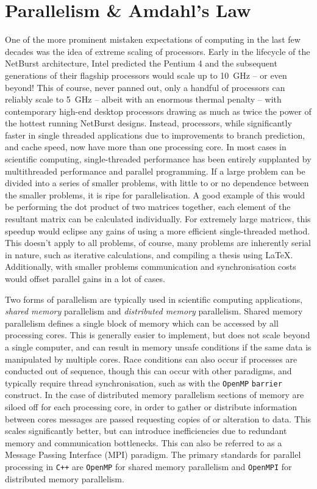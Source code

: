 \section{Parallelism \& Amdahl's Law}
\label{app:parallelism}

One of the more prominent mistaken expectations of computing in the last few decades was the idea of extreme scaling of processors.
Early in the lifecycle of the NetBurst architecture, Intel predicted the Pentium 4 and the subsequent generations of their flagship processors would scale up to \SI{10}{\giga\hertz} -- or even beyond!
This of course, never panned out, only a handful of processors can reliably scale to \SI{5}{\giga\hertz} -- albeit with an enormous thermal penalty -- with contemporary high-end desktop processors drawing as much as twice the power of the hottest running NetBurst designs.
Instead, processors, while significantly faster in single threaded applications due to improvements to branch prediction, and cache speed, now have more than one processing core.
In most cases in scientific computing, single-threaded performance has been entirely supplanted by multithreaded performance and parallel programming.
If a large problem can be divided into a series of smaller problems, with little to or no dependence between the smaller problems, it is ripe for parallelisation.
A good example of this would be performing the dot product of two matrices together, each element of the resultant matrix can be calculated individually.
For extremely large matrices, this speedup would eclipse any gains of using a more efficient single-threaded method.
This doesn't apply to all problems, of course, many problems are inherently serial in nature, such as iterative calculations, and compiling a thesis using \LaTeX.
Additionally, with smaller problems communication and synchronisation costs would offset parallel gains in a lot of cases.

Two forms of parallelism are typically used in scientific computing applications, \emph{shared memory} parallelism and \emph{distributed memory} parallelism.
Shared memory parallelism defines a single block of memory which can be accessed by all processing cores.
This is generally easier to implement, but does not scale beyond a single computer, and can result in memory unsafe conditions if the same data is manipulated by multiple cores.
Race conditions can also occur if processes are conducted out of sequence, though this can occur with other paradigms, and typically require thread synchronisation, such as with the \texttt{OpenMP} \texttt{barrier} construct.
In the case of distributed memory parallelism sections of memory are siloed off for each processing core, in order to gather or distribute information between cores messages are passed requesting copies of or alteration to data.
This scales significantly better, but can introduce inefficiencies due to redundant memory and communication bottlenecks.
This can also be referred to as a Message Passing Interface (MPI) paradigm.
The primary standards for parallel processing in \texttt{C++} are \texttt{OpenMP} for shared memory parallelism and \texttt{OpenMPI} for distributed memory parallelism.

